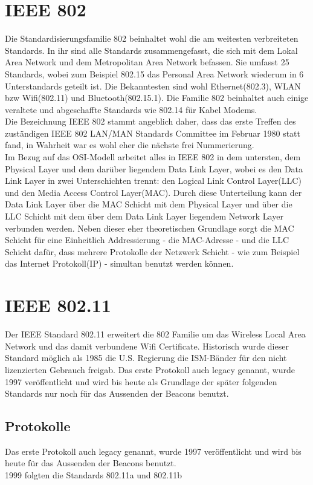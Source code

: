 \documentclass[a4paper,13pt]{scrartcl}
\begin{document}
\section{IEEE 802}
Die Standardisierungsfamilie 802 beinhaltet wohl die am weitesten verbreiteten Standards. In ihr sind alle Standards zusammengefasst, die sich mit dem Lokal Area Network und dem Metropolitan Area Network befassen. Sie umfasst 25 Standards, wobei zum Beispiel 802.15 das Personal Area Network wiederum in 6 Unterstandards geteilt ist. Die Bekanntesten sind wohl Ethernet(802.3), WLAN bzw Wifi(802.11) und Bluetooth(802.15.1). Die Familie 802 beinhaltet auch einige veraltete und abgeschaffte Standards wie 802.14 für Kabel Modems. \\
Die Bezeichnung IEEE 802 stammt angeblich daher, dass das erste Treffen des zuständigen \glqq IEEE 802 LAN/MAN Standards Committee \grqq  im Februar 1980 statt fand, in Wahrheit war es wohl eher die nächste frei Nummerierung.\\
Im Bezug auf das OSI-Modell arbeitet alles in IEEE 802 in dem untersten, dem Physical Layer und dem darüber liegendem Data Link Layer, wobei es den Data Link Layer in zwei Unterschichten trennt: den Logical Link Control Layer(LLC) und den Media Access Control Layer(MAC). Durch diese Unterteilung kann der Data Link Layer über die MAC Schicht mit dem Physical Layer und über die LLC Schicht mit dem über dem Data Link Layer liegendem Network Layer verbunden werden. Neben dieser eher theoretischen Grundlage sorgt die MAC Schicht für eine Einheitlich Addressierung - die MAC-Adresse - und die LLC Schicht dafür, dass mehrere Protokolle der Netzwerk Schicht - wie zum Beispiel das Internet Protokoll(IP) - simultan benutzt werden können. \newpage
\section{IEEE 802.11}
Der IEEE Standard 802.11 erweitert die 802 Familie um das Wireless Local Area Network und das damit verbundene Wifi Certificate. Historisch wurde dieser Standard möglich als 1985 die U.S. Regierung die ISM-Bänder für den nicht lizenzierten Gebrauch freigab. Das erste Protokoll auch legacy genannt, wurde 1997 veröffentlicht und wird bis heute als Grundlage der später folgenden Standards nur noch für das Aussenden der Beacons benutzt.
\subsection{Protokolle}
Das erste Protokoll auch legacy genannt, wurde 1997 veröffentlicht und wird bis heute für das Aussenden der Beacons benutzt. \\
1999 folgten die Standards 802.11a und 802.11b
\end{document}

